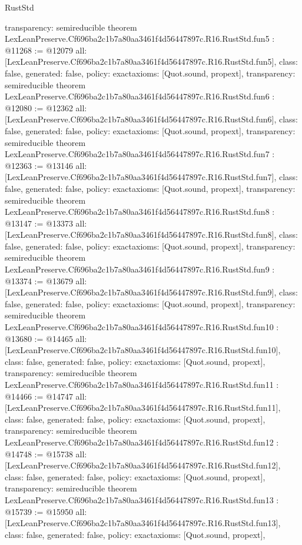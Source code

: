 \begin{lexlean}{RustStd}
\begin{coremodule}
{  transparency: semireducible
}
theorem LexLeanPreserve.Cf696ba2c1b7a80aa3461f4d56447897c.R16.RustStd.fun5 : @11268 := @12079 {
  all: [LexLeanPreserve.Cf696ba2c1b7a80aa3461f4d56447897c.R16.RustStd.fun5],
  class: false,
  generated: false,
  policy: exact{axioms: [Quot.sound, propext]},
  transparency: semireducible
}
theorem LexLeanPreserve.Cf696ba2c1b7a80aa3461f4d56447897c.R16.RustStd.fun6 : @12080 := @12362 {
  all: [LexLeanPreserve.Cf696ba2c1b7a80aa3461f4d56447897c.R16.RustStd.fun6],
  class: false,
  generated: false,
  policy: exact{axioms: [Quot.sound, propext]},
  transparency: semireducible
}
theorem LexLeanPreserve.Cf696ba2c1b7a80aa3461f4d56447897c.R16.RustStd.fun7 : @12363 := @13146 {
  all: [LexLeanPreserve.Cf696ba2c1b7a80aa3461f4d56447897c.R16.RustStd.fun7],
  class: false,
  generated: false,
  policy: exact{axioms: [Quot.sound, propext]},
  transparency: semireducible
}
theorem LexLeanPreserve.Cf696ba2c1b7a80aa3461f4d56447897c.R16.RustStd.fun8 : @13147 := @13373 {
  all: [LexLeanPreserve.Cf696ba2c1b7a80aa3461f4d56447897c.R16.RustStd.fun8],
  class: false,
  generated: false,
  policy: exact{axioms: [Quot.sound, propext]},
  transparency: semireducible
}
theorem LexLeanPreserve.Cf696ba2c1b7a80aa3461f4d56447897c.R16.RustStd.fun9 : @13374 := @13679 {
  all: [LexLeanPreserve.Cf696ba2c1b7a80aa3461f4d56447897c.R16.RustStd.fun9],
  class: false,
  generated: false,
  policy: exact{axioms: [Quot.sound, propext]},
  transparency: semireducible
}
theorem LexLeanPreserve.Cf696ba2c1b7a80aa3461f4d56447897c.R16.RustStd.fun10 : @13680 := @14465 {
  all: [LexLeanPreserve.Cf696ba2c1b7a80aa3461f4d56447897c.R16.RustStd.fun10],
  class: false,
  generated: false,
  policy: exact{axioms: [Quot.sound, propext]},
  transparency: semireducible
}
theorem LexLeanPreserve.Cf696ba2c1b7a80aa3461f4d56447897c.R16.RustStd.fun11 : @14466 := @14747 {
  all: [LexLeanPreserve.Cf696ba2c1b7a80aa3461f4d56447897c.R16.RustStd.fun11],
  class: false,
  generated: false,
  policy: exact{axioms: [Quot.sound, propext]},
  transparency: semireducible
}
theorem LexLeanPreserve.Cf696ba2c1b7a80aa3461f4d56447897c.R16.RustStd.fun12 : @14748 := @15738 {
  all: [LexLeanPreserve.Cf696ba2c1b7a80aa3461f4d56447897c.R16.RustStd.fun12],
  class: false,
  generated: false,
  policy: exact{axioms: [Quot.sound, propext]},
  transparency: semireducible
}
theorem LexLeanPreserve.Cf696ba2c1b7a80aa3461f4d56447897c.R16.RustStd.fun13 : @15739 := @15950 {
  all: [LexLeanPreserve.Cf696ba2c1b7a80aa3461f4d56447897c.R16.RustStd.fun13],
  class: false,
  generated: false,
  policy: exact{axioms: [Quot.sound, propext]},
}
\end{coremodule}
\end{lexlean}
